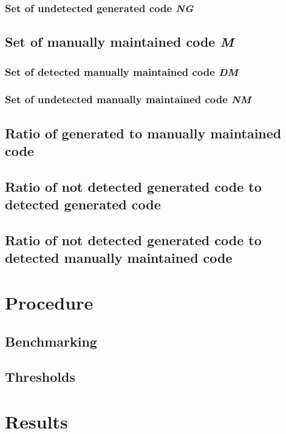 \subsubsection{Set of undetected generated code \textit{NG}}

\subsection{Set of manually maintained code \textit{M}}

\subsubsection{Set of detected manually maintained code \textit{DM}}

\subsubsection{Set of undetected manually maintained code \textit{NM}}

\subsection{Ratio of generated to manually maintained code}

\subsection{Ratio of not detected generated code to detected generated code}

\subsection{Ratio of not detected generated code to detected manually maintained code}

\section{Procedure}

\subsection{Benchmarking}

\subsection{Thresholds}

\section{Results}

